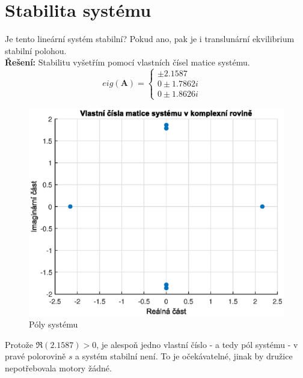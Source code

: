 \documentclass[twoside]{article}
\begin{document}
\section{Stabilita systému}
\label{sec:ukol1}
Je tento lineární systém stabilní? Pokud ano, pak je i translunární ekvilibrium stabilní polohou. \\
\textbf{Řešení:}
Stabilitu vyšetřím pomocí vlastních čísel matice systému.
\begin{equation*}
	eig(\mathbf{A}) =
	\begin{cases}
		\pm 2.1587 & \\
		0 \pm 1.7862i & \\
		0 \pm 1.8626i \ &
	\end{cases}
\end{equation*}
\begin{figure}[hbtp]
	\centering
	\includegraphics{vlastni_cisla.eps}
	\caption{Póly systému}
	\label{fig:vlastni_cisla}
\end{figure}
Protože $\Re(2.1587) > 0$, je alespoň jedno vlastní číslo - a tedy pól systému - v pravé polorovině $s$ a systém stabilní není.
To je očekávatelné, jinak by družice nepotřebovala motory žádné. 
\end{document}
